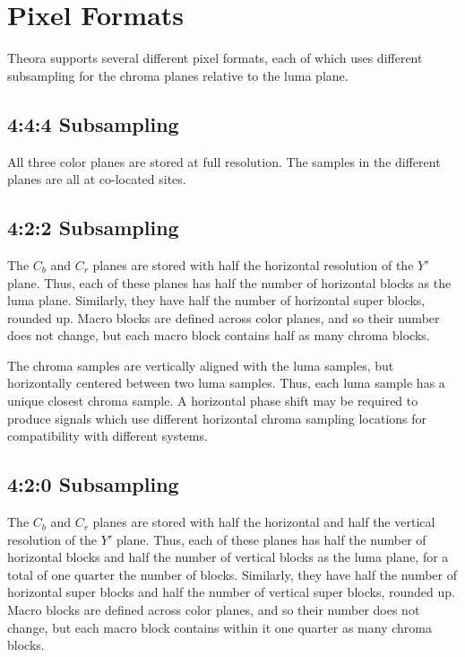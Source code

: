 \documentclass[11pt,letterpaper]{book}
\numberwithin{equation}{chapter}
\numberwithin{figure}{chapter}
\numberwithin{table}{chapter}
\begin{document}
\section{Pixel Formats}
\label{sec:pixfmts}

Theora supports several different pixel formats, each of which uses different
 subsampling for the chroma planes relative to the luma plane.

\subsection{4:4:4 Subsampling}
\label{sec:444}

All three color planes are stored at full resolution.
The samples in the different planes are all at co-located sites.

%
%
%
%
%
%


\subsection{4:2:2 Subsampling}
\label{sec:422}

The $C_b$ and $C_r$ planes are stored with half the horizontal resolution of
 the $Y'$ plane.
Thus, each of these planes has half the number of horizontal blocks as the luma
 plane.
Similarly, they have half the number of horizontal super blocks, rounded up.
Macro blocks are defined across color planes, and so their number does not
 change, but each macro block contains half as many chroma blocks.

The chroma samples are vertically aligned with the luma samples, but
 horizontally centered between two luma samples.
Thus, each luma sample has a unique closest chroma sample.
A horizontal phase shift may be required to produce signals which use different
 horizontal chroma sampling locations for compatibility with different systems.

%
%
%
%
%
%

\subsection{4:2:0 Subsampling}
\label{sec:420}

The $C_b$ and $C_r$ planes are stored with half the horizontal and half the
 vertical resolution of the $Y'$ plane.
Thus, each of these planes has half the number of horizontal blocks and half
 the number of vertical blocks as the luma plane, for a total of one quarter
 the number of blocks.
Similarly, they have half the number of horizontal super blocks and half the
 number of vertical super blocks, rounded up.
Macro blocks are defined across color planes, and so their number does not
 change, but each macro block contains within it one quarter as many 
 chroma blocks.
\end{document}
